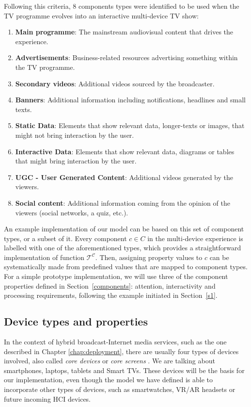 Following this criteria, 8 components types were identified to be used when the TV programme evolves into an interactive multi-device TV show:
\begin{enumerate}
	\item \textbf{Main programme}: The mainstream audiovisual content that drives the experience.
	\item \textbf{Advertisements}: Business-related resources advertising something within the TV programme. 
	\item \textbf{Secondary videos}: Additional videos sourced by the broadcaster. 
	\item \textbf{Banners}: Additional information including notifications, headlines and small texts.
	\item \textbf{Static Data}: Elements that show relevant data, longer-texts or images, that might not bring interaction by the user.
	\item \textbf{Interactive Data}: Elements that show relevant data, diagrams or tables that might bring interaction by the user.
	\item \textbf{UGC - User Generated Content}: Additional videos generated by the viewers.
	\item \textbf{Social content}: Additional information coming from the opinion of the viewers (social networks, a quiz, etc.).
\end{enumerate}

An example implementation of our model can be based on this set of component types, or a subset of it. 
Every component $c \in C$ in the multi-device experience is labelled with one of the aforementioned types, which provides a straightforward implementation of function $\mathcal{T^C}$.
Then, assigning property values to $c$ can be systematically made from predefined values that are mapped to component types.
For a simple prototype implementation, we will use three of the component properties defined in Section~\ref{components}: attention, interactivity and processing requirements, following the example initiated in Section~\ref{s1}.

\subsection{Device types and properties} \label{imp_dev}

In the context of hybrid broadcast-Internet media services, such as the one described in Chapter \ref{chap:deployment}, there are usually four types of devices involved, also called \textit{core devices} or \textit{core screens} \cite{nagel2015multiscreen}. 
We are talking about smartphones, laptops, tablets and Smart TVs.
These devices will be the basis for our implementation, even though the model we have defined is able to incorporate other types of devices, such as smartwatches, VR/AR headsets or future incoming HCI devices.

